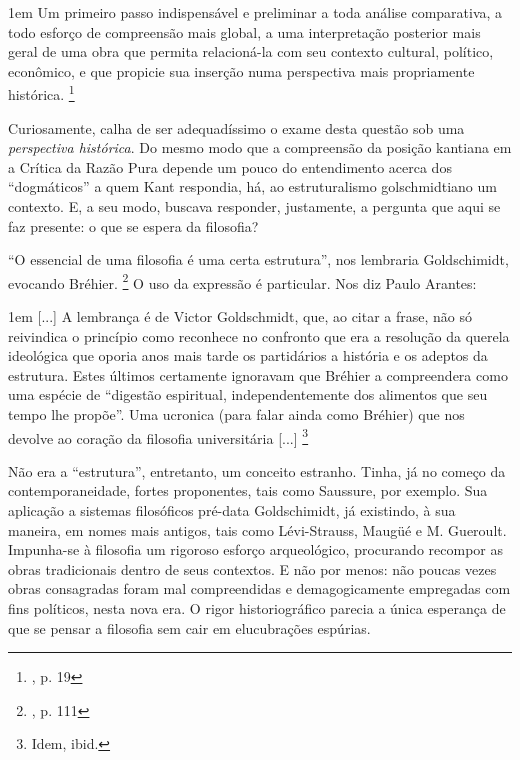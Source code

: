 \documentclass[12pt,a4paper]{article}
\newenvironment{citac}{
	\begin{addmargin}[4cm]{1em} \footnotesize}{\normalfont \end{addmargin}
}
\begin{document}
	\begin{citac}
		Um primeiro passo indispensável e preliminar a toda análise 
		comparativa, a todo esforço de compreensão mais global, a 
		uma interpretação posterior mais geral de uma obra que 
		permita relacioná-la com seu contexto cultural, político, 
		econômico, e que propicie sua inserção numa perspectiva mais 
		propriamente histórica. \footnote{\cite{porchat}, p. 19} 
	\end{citac}

	Curiosamente, calha de ser adequadíssimo o exame desta questão sob 
	uma \textit{perspectiva histórica}. Do mesmo modo que a compreensão 
	da posição kantiana em a Crítica da Razão Pura depende um pouco do 
	entendimento acerca dos “dogmáticos” a quem Kant respondia, há, ao 
	estruturalismo golschmidtiano um contexto. E, a seu modo, buscava 
	responder, justamente, a pergunta que aqui se faz presente: o que 
	se espera da filosofia? 

	“O essencial de uma filosofia é uma certa estrutura”, nos lembraria 
	Goldschimidt, evocando Bréhier. \footnote{\cite{aradpfr}, p. 111}
	O uso da expressão é particular. Nos diz Paulo Arantes: 

	\begin{citac}
		[...] A lembrança é de Victor Goldschmidt, que, ao citar 
		a frase, não só reivindica o princípio como reconhece no 
		confronto que era a resolução da querela ideológica que 
		oporia anos mais tarde os partidários a história e os 
		adeptos da estrutura. Estes últimos certamente ignoravam 
		que Bréhier a compreendera como uma espécie de “digestão 
		espiritual, independentemente dos alimentos que seu tempo
		lhe propõe”. Uma ucronica (para falar ainda como Bréhier)
		que nos devolve ao coração da filosofia universitária [...]
		\footnote{Idem, ibid.}
	\end{citac}

	Não era a “estrutura”, entretanto, um conceito estranho. Tinha, 
	já no começo da contemporaneidade, fortes proponentes, tais como 
	Saussure, por exemplo. Sua aplicação a sistemas filosóficos 
	pré-data Goldschimidt, já existindo, à sua maneira, em nomes mais 
	antigos, tais como Lévi-Strauss, Maugüé e M. Gueroult. Impunha-se 
	à filosofia um rigoroso esforço arqueológico, procurando recompor 
	as obras tradicionais dentro de seus contextos. E não por menos: 
	não poucas vezes obras consagradas foram mal compreendidas e 
	demagogicamente empregadas com fins políticos, nesta nova era. 
	O rigor historiográfico parecia a única esperança de que se 
	pensar a filosofia sem cair em elucubrações espúrias.  
\end{document}
